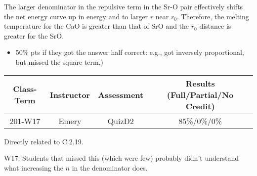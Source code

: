 \begin{solution}

The larger denominator in the repulsive term in the Sr-O pair effectively shifts the net energy curve up in energy and to larger $r$ near $r_0$. Therefore, the melting temperature for the CaO is greater than that of SrO and the $r_0$ distance is greater for the SrO. 
	
\end{solution}

\begin{rubric}

\begin{itemize}
	\item 50\% pts if they got the answer half correct: e.g., got inversely proportional, but missed the square term.)
\end{itemize}

\end{rubric}

\begin{outcomes}
	\begin{center}
		\begin{tabular}{cccc}
			\hline\hline
                Class-Term & Instructor & Assessment & Results (Full/Partial/No Credit) \\
			\hline
                201-W17 & Emery & QuizD2 & 85\%/0\%/0\%\\
			\hline
		\end{tabular}
	\end{center}
\end{outcomes}

\begin{comments}

Directly related to C$|$2.19.

W17: Students that missed this (which were few) probably didn't understand what increasing the $n$ in the denominator does.
	
\end{comments}
